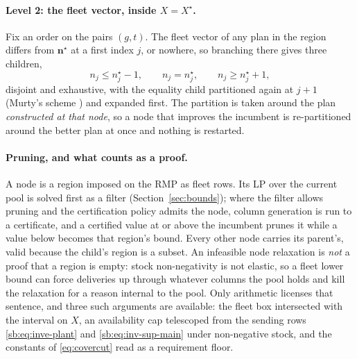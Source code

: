 \paragraph{Level 2: the fleet vector, inside $X=X^{\star}$.}
Fix an order on the pairs $(g,t)$. The fleet vector of any plan in the
region differs from $\mathbf{n}^{\star}$ at a first index $j$, or
nowhere, so branching there gives three children,
\begin{equation}
n_{j}\le n^{\star}_{j}-1,
\qquad
n_{j}= n^{\star}_{j},
\qquad
n_{j}\ge n^{\star}_{j}+1,
\label{eq:murty}
\end{equation}
disjoint and exhaustive, with the equality child partitioned again at
$j+1$ (Murty's scheme \autocite{Murty1968AnAlgorithm}) and expanded
first. The partition is taken around the plan \emph{constructed at that
node}, so a node that improves the incumbent is re-partitioned around
the better plan at once and nothing is restarted.



\paragraph{Pruning, and what counts as a proof.}
A node is a region imposed on the RMP as fleet rows. Its LP over the
current pool is solved first as a filter (Section~\ref{sec:bounds});
where the filter allows pruning and the certification policy admits the
node, column generation is run to a certificate, and a certified value
at or above the incumbent prunes it while a value below becomes that
region's bound. Every other node carries its parent's, valid because
the child's region is a subset. An infeasible node relaxation is
\emph{not} a proof that a region is empty: stock non-negativity is not
elastic, so a fleet lower bound can force deliveries up through
whatever columns the pool holds and kill the relaxation for a reason
internal to the pool. Only arithmetic licenses that sentence, and three
such arguments are available: the fleet box intersected with the
interval on $X$, an availability cap telescoped from the sending rows
\eqref{sb:eq:inve-plant} and \eqref{sb:eq:inv-sup-main} under
non-negative stock, and the constants of \eqref{eq:covercut} read as a
requirement floor.

